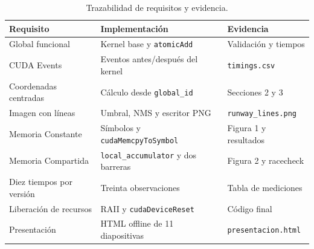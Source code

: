 \documentclass[12pt,letterpaper]{article}
\begin{document}
\begin{table}[H]
  \centering
  \caption{Trazabilidad de requisitos y evidencia.}
  \begin{tabularx}{\textwidth}{X X X}
    \toprule
    Requisito & Implementación & Evidencia \\
    \midrule
    Global funcional & Kernel base y \texttt{atomicAdd} & Validación y tiempos \\
    CUDA Events & Eventos antes/después del kernel & \texttt{timings.csv} \\
    Coordenadas centradas & Cálculo desde \texttt{global\_id} & Secciones 2 y 3 \\
    Imagen con líneas & Umbral, NMS y escritor PNG & \texttt{runway\_lines.png} \\
    Memoria Constante & Símbolos y \texttt{cudaMemcpyToSymbol} & Figura 1 y resultados \\
    Memoria Compartida & \texttt{local\_accumulator} y dos barreras & Figura 2 y racecheck \\
    Diez tiempos por versión & Treinta observaciones & Tabla de mediciones \\
    Liberación de recursos & RAII y \texttt{cudaDeviceReset} & Código final \\
    Presentación & HTML offline de 11 diapositivas & \texttt{presentacion.html} \\
    \bottomrule
  \end{tabularx}
\end{table}
\end{document}
